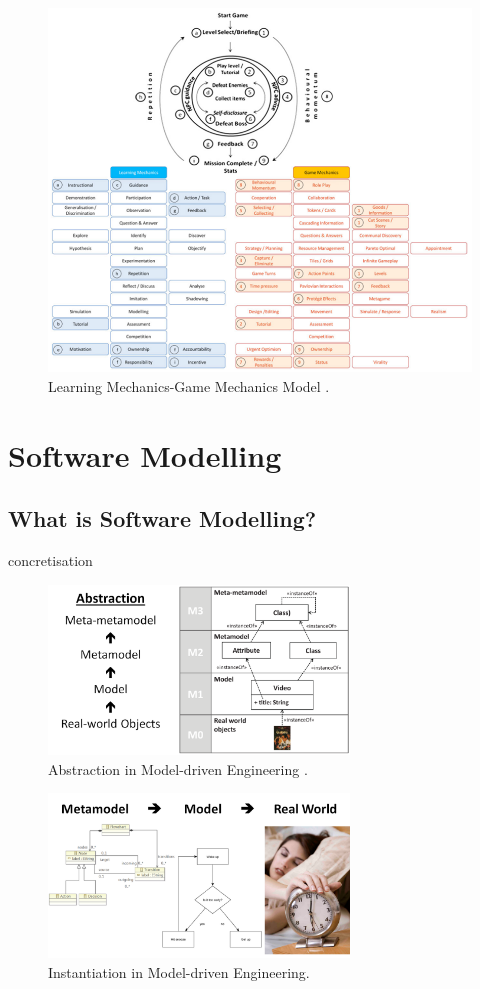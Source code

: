 \documentclass[12pt, a4paper]{report}
\begin{document}
\begin{figure}[ht]
\centering
\includegraphics[width=12cm]{lmgm}
\caption{Learning Mechanics-Game Mechanics Model \cite{arnab2015mapping}.}
\label{fig:lmgm}
\end{figure}


\section{Software Modelling}

\subsection{What is Software Modelling?}

concretisation
\begin{figure}[ht]
\centering
\includegraphics[width=8cm]{abstraction}
\caption{Abstraction in Model-driven Engineering \cite{brambilla2012model}.}
\label{fig:abstraction}
\end{figure}


\begin{figure}[ht]
\centering
\includegraphics[width=8cm]{concretisation}
\caption{Instantiation in Model-driven Engineering.}
\label{fig:concretisation}
\end{figure}
\end{document}
